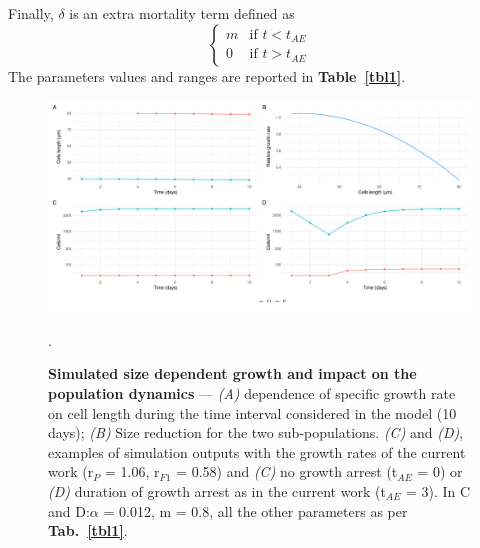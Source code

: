 \documentclass[a4paper,oneside]{article}
\begin{document}
    Finally, $\delta$ is an extra mortality term defined as
    \[
      \begin{cases}
        m & \mbox{if } t < t_{AE} \\
        0 & \mbox{if } t > t_{AE}
      \end{cases}
    \]
    The parameters values and ranges are reported in \textbf{Table~\ref{tbl1}}.
%
  
    \begin{figure}[p]
      \includegraphics[width=\linewidth]{imgs/Figpan.pdf}
      \caption{\textbf{Simulated size dependent growth and impact on the population dynamics} ---
        {\color{blue}\textit{(A)}} dependence of specific growth rate on cell length during the time interval considered in the model (10 days);
        {\color{blue}\textit{(B)}} Size reduction for the two sub-populations.
        {\color{blue}\textit{(C)}} and {\color{blue}\textit{(D)}}, examples of simulation outputs with the growth rates of the current work (r$_{P}$ = 1.06, r$_{F1}$ = 0.58) and {\color{blue}\textit{(C)}} no growth arrest (t$_{AE}$ = 0) or {\color{blue}\textit{(D)}} duration of growth arrest as in the current work (t$_{AE}$ = 3). In C and D:\@$\alpha$ = 0.012, m = 0.8, all the other parameters as per \textbf{Tab.~\ref{tbl1}}.
      }\label{fdyn}.
    \end{figure}
\end{document}

